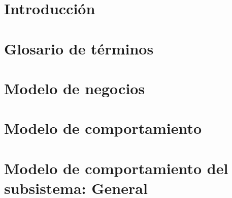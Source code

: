 \documentclass[10pt]{book}
\begin{document}
\thispagestyle{empty}

\makeObservaciones[20cm]
\frontmatter
\tableofcontents
\listoffigures
\mainmatter

\hideControlVersion

\chapter{Introducción}\label{chp:introduccion}


\chapter{Glosario de términos}\label{chp:glosarioTerminos}



\chapter{Modelo de negocios}\label{chp:modeloNegocios}

\chapter{Modelo de comportamiento}\label{chp:modeloComportamiento}


\chapter{Modelo de comportamiento del subsistema: General}
\label{chp:general}
\end{document}
